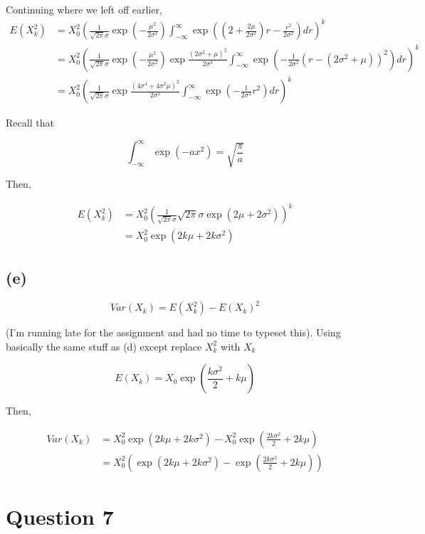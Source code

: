 \documentclass[11pt]{scrartcl}
\begin{document}
Continuing where we left off earlier,
\begin{align*}
E(X_k^2) &= X_0^2 \left(\frac{1}{\sqrt{2\pi}\sigma} \exp{\left(-\frac{\mu^2}{2\sigma^2}\right)} \int_{-\infty}^{\infty} \exp{\left(\left(2 + \frac{2\mu}{2\sigma^2}\right)r - \frac{r^2}{2\sigma^2}\right)} dr \right)^k \\
&= X_0^2 \left(\frac{1}{\sqrt{2\pi}\sigma} \exp{\left(-\frac{\mu^2}{2\sigma^2}\right)} \exp{\frac{(2\sigma^2 + \mu)^2}{2\sigma^2}} \int_{-\infty}^{\infty} \exp{\left( -\frac{1}{2\sigma^2} (r - (2\sigma^2 + \mu))^2 \right)} dr \right)^k \\
&= X_0^2 \left(\frac{1}{\sqrt{2\pi}\sigma} \exp{\frac{(4\sigma^4 + 4\sigma^2\mu)^2}{2\sigma^2}} \int_{-\infty}^{\infty} \exp{\left( -\frac{1}{2\sigma^2}r^2 \right)} dr \right)^k
\end{align*}

Recall that

\[\int_{-\infty}^\infty \exp{(-ax^2)} = \sqrt{\frac{\pi}{a}}\]

Then,

\begin{align*}
E(X_k^2) &= X_0^2 \left(\frac{1}{\sqrt{2\pi}\sigma} \sqrt{2\pi} \sigma \exp{(2\mu + 2\sigma^2)}\right)^k \\
&= X_0^2 \exp{(2k\mu + 2k\sigma^2)}
\end{align*}

\subsection*{(e)}

\[Var(X_k) = E(X_k^2) - E(X_k)^2\]

(I'm running late for the assignment and had no time to typeset this). Using basically the same stuff as (d) except replace $X_k^2$ with $X_k$

\[E(X_k) = X_0 \exp{\left( \frac{k\sigma^2}{2} + k\mu\right)}\]

Then,

\begin{align*}
Var(X_k) &= X_0^2 \exp{(2k\mu + 2k\sigma^2)} - X_0^2 \exp{\left( \frac{2k\sigma^2}{2} + 2k\mu\right)}\\
&= X_0^2 \left( \exp{(2k\mu + 2k\sigma^2)} - \exp{\left( \frac{2k\sigma^2}{2} + 2k\mu\right)}\right)
\end{align*}

\section*{Question 7}
\end{document}
